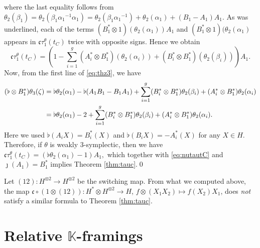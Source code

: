 \documentclass[a4paper,12pt, twoside]{amsart}
\theoremstyle{definition}
\theoremstyle{remark}
\numberwithin{equation}{section}
\newcommand\bK{{\mathbb{K}}}
\newcommand\inv{^{-1}}
\begin{document}
where the last equality follows from $\theta_2(\beta_1) = \theta_2(\beta_1{\alpha_1}\inv\alpha_1) = \theta_2(\beta_1{\alpha_1}\inv) + \theta_2(\alpha_1) + (B_1-A_1)A_1$. 
As was underlined, each of the terms $(B^*_1\otimes 1)(\theta_2(\alpha_1))A_1$ and $(B^*_1\otimes 1)(\theta_2(\alpha_1)$ appears in $\mathfrak{c}\tau^\theta_1(t_C)$ twice with opposite signs. Hence we obtain 
\begin{equation}\label{eq:k1tautC}
\mathfrak{c}\tau^\theta_1(t_C) 
=\left(1 -\sum^g_{i=1}(A^*_i\otimes B^*_1)(\theta_2(\alpha_i))
+ (B^*_i\otimes B^*_1)(\theta_2(\beta_i))\right)A_1.
\end{equation}
Now, from the first line of \eqref{eq:thz3}, we have
\begin{equation*}
\aligned
 (\flat\otimes B^*_1)\theta_3(\zeta) 
&= \flat\theta_2(\alpha_1) - \flat(A_1B_1-B_1A_1)
+ \sum^g_{i=1}(B^*_i\otimes B^*_1)\theta_2(\beta_i) + (A^*_i\otimes B^*_1)\theta_2(\alpha_i) \\
&= \flat\theta_2(\alpha_1) -2
+ \sum^g_{i=1}(B^*_i\otimes B^*_1)\theta_2(\beta_i) + (A^*_i\otimes B^*_1)\theta_2(\alpha_i).\\
\endaligned
\end{equation*}
Here we used $\flat(A_iX) = B^*_i(X)$ and $\flat(B_iX) =  -A^*_i(X)$ for any $X \in H$. 
Therefore, if $\theta$ is weakly $3$-symplectic, then we have
$
\mathfrak{c}\tau^\theta_1(t_C) = (\flat\theta_2(\alpha_1) - 1)A_1,
$
which together with \eqref{eq:nutautC} and $\jmath(A_1) = B^*_1$
implies Theorem \ref{thm:tauc}.\qed
\par
Let $(12): H^{\otimes 2} \to H^{\otimes 2}$ be the switching map. 
From what we computed above, the map $\mathfrak{c}\circ(1\otimes (12)): H^*\otimes H^{\otimes 2} \to H$, $f\otimes (X_1X_2) \mapsto f(X_2)X_1$, does {\it not} satisfy a similar formula to Theorem \ref{thm:tauc}. 
\par


%
%
\section{Relative $\bK$-framings}\label{sec:relf}
\end{document}
